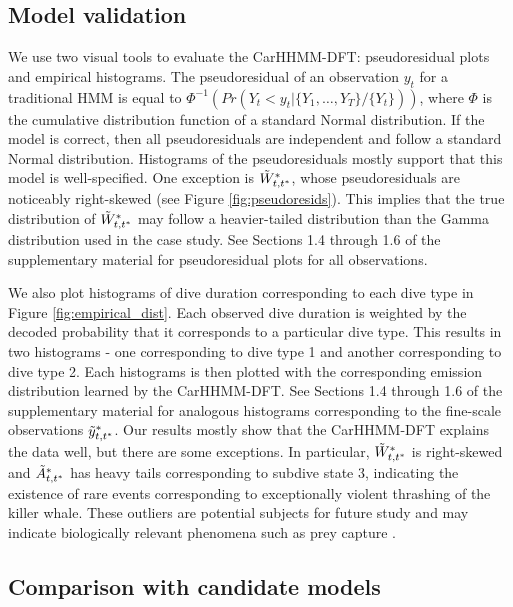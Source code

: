 \subsection{Model validation}
\label{subsec:model_validation}

We use two visual tools to evaluate the CarHHMM-DFT: pseudoresidual plots and empirical histograms. The pseudoresidual of an observation $y_t$ for a traditional HMM is equal to $\Phi^{-1} \left(Pr(Y_t < y_t|\{Y_1,\ldots,Y_T\}/\{Y_t\}) \right)$, where $\Phi$ is the cumulative distribution function of a standard Normal distribution. If the model is correct, then all pseudoresiduals are independent and follow a standard Normal distribution. Histograms of the pseudoresiduals mostly support that this model is well-specified. One exception is $\tilde{W}^*_{t,t^*}$, whose pseudoresiduals are noticeably right-skewed (see Figure \ref{fig:pseudoresids}). This implies that the true distribution of $\tilde{W}^*_{t,t^*}$ may follow a heavier-tailed distribution than the Gamma distribution used in the case study. See Sections 1.4 through 1.6 of the supplementary material for pseudoresidual plots for all observations.

We also plot histograms of dive duration corresponding to each dive type in Figure \ref{fig:empirical_dist}. Each observed dive duration is weighted by the decoded probability that it corresponds to a particular dive type. This results in two histograms - one corresponding to dive type 1 and another corresponding to dive type 2. Each histograms is then plotted with the corresponding emission distribution learned by the CarHHMM-DFT. See Sections 1.4 through 1.6 of the supplementary material for analogous histograms corresponding to the fine-scale observations $\tilde{y}^*_{t,t^*}$. Our results mostly show that the CarHHMM-DFT explains the data well, but there are some exceptions. In particular, $\tilde{W}^*_{t,t^*}$ is right-skewed and $\tilde{A}^*_{t,t^*}$ has heavy tails corresponding to subdive state 3, indicating the existence of rare events corresponding to exceptionally violent thrashing of the killer whale. These outliers are potential subjects for future study and may indicate biologically relevant phenomena such as prey capture \citep{Tennessen:2019a}.

\subsection{Comparison with candidate models}

